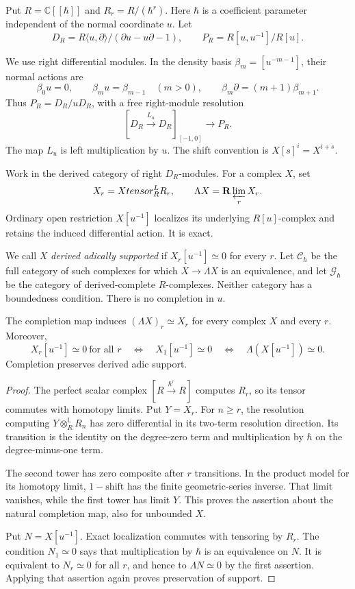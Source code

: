 Put $R=\mathbb C[[\hbar]]$ and $R_r=R/(\hbar^r)$.
Here $\hbar$ is a coefficient parameter independent of
the normal coordinate $u$. Let
\[
 D_R=R\langle u,\partial\rangle/(\partial u-u\partial-1),
 \qquad P_R=R[u,u^{-1}]/R[u].
\]

We use right differential modules. In the density basis
$\beta_m=[u^{-m-1}]$, their normal actions are
\[
 \beta_0u=0,\qquad \beta_mu=\beta_{m-1}\quad(m>0),
 \qquad \beta_m\partial=(m+1)\beta_{m+1}.
\]
Thus $P_R=D_R/uD_R$, with a free right-module resolution
\begin{equation}\label{mht:eq:normal-free-resolution}
 [D_R\xrightarrow{L_u}D_R]_{[-1,0]}\longrightarrow P_R.
\end{equation}
The map $L_u$ is left multiplication by $u$.
The shift convention is $X[s]^i=X^{i+s}$.

Work in the derived category of right $D_R$-modules.
For a complex $X$, set
\[
 X_r=X\otimes_R^{\mathbb L}R_r,
 \qquad \Lambda X=\mathbf R\varprojlim_r X_r.
\]
Ordinary open restriction $X[u^{-1}]$ localizes its underlying
$R[u]$-complex and retains the induced differential action.
It is exact.

We call $X$ \emph{derived adically supported}
if $X_r[u^{-1}]\simeq0$ for every $r$.
Let $\mathcal C_\hbar$ be the full category of such complexes
for which $X\to\Lambda X$ is an equivalence, and let
$\mathcal G_\hbar$ be the category of derived-complete
$R$-complexes. Neither category has a boundedness condition.
There is no completion in $u$.

\begin{lemma}\label{mht:lem:normal-completion-precision}
The completion map induces
$(\Lambda X)_r\simeq X_r$ for every complex $X$ and every $r$.
Moreover,
\[
 X_r[u^{-1}]\simeq0\ \text{for all }r
 \quad\Longleftrightarrow\quad X_1[u^{-1}]\simeq0
 \quad\Longleftrightarrow\quad\Lambda(X[u^{-1}])\simeq0.
\]
Completion preserves derived adic support.
\end{lemma}
\begin{proof}
The perfect scalar complex $[R\xrightarrow{\hbar^r}R]$
computes $R_r$, so its tensor commutes with homotopy limits.
Put $Y=X_r$. For $n\geq r$, the resolution computing
$Y\otimes_R^{\mathbb L}R_n$ has zero differential in its
two-term resolution direction. Its transition is the identity
on the degree-zero term and multiplication by $\hbar$
on the degree-minus-one term.

The second tower has zero composite after $r$ transitions.
In the product model for its homotopy limit, $1-\mathrm{shift}$
has the finite geometric-series inverse. That limit vanishes,
while the first tower has limit $Y$. This proves the assertion
about the natural completion map, also for unbounded $X$.

Put $N=X[u^{-1}]$. Exact localization commutes with
tensoring by $R_r$. The condition $N_1\simeq0$ says that multiplication
by $\hbar$ is an equivalence on $N$. It is equivalent to
$N_r\simeq0$ for all $r$, and hence to $\Lambda N\simeq0$
by the first assertion. Applying that assertion again proves
preservation of support.
\end{proof}

